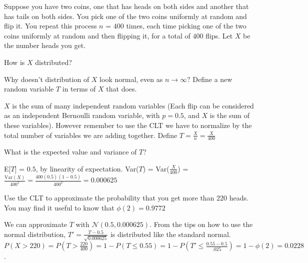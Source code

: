 Suppose you have two coins, one that has heads on both sides and another that has tails on both sides. You pick one of the two coins uniformly at random and flip it. You repeat this process $n$ = $400$ times, each time picking one of the two coins uniformly at random and then flipping it, for a total of $400$ flips. Let $X$ be the number heads you get.

\begin{question}
How is $X$ distributed?

\begin{solution}
\end{solution}
\end{question}

\begin{question}
Why doesn't distribution of $X$ look normal, even as $n \to \infty?$  Define a new random variable $T$ in terms of $X$ that does.

\begin{solution}
$X$ is the sum of many independent random variables (Each flip can be considered as an independent Bernoulli random variable, with $p = 0.5$, and $X$ is the sum of these variables). However remember to use the CLT we have to normalize by the total number of variables we are adding together. Define $T = \frac{X}{n} = \frac{X}{400}$
\end{solution}
\end{question}

\begin{question}
What is the expected value and variance of $T$?

\begin{solution}
E[$T$] = $0.5$, by linearity of expectation. Var($T$) = Var($\frac{X}{400}$)  = $\frac{\text{Var}(X)}{400^2} = \frac{400(0.5)(1-0.5)}{400^2} = 0.000625$
\end{solution}
\end{question}

\begin{question}
Use the CLT to approximate the probability that you get more than 220 heads. You may find it useful to know that $\phi(2) = 0.9772$

\begin{solution}
We can approximate $T$ with $\mathcal{N}(0.5, 0.000625)$. From the tips on how to use the normal distribution, $T' = \frac{T-0.5}{\sqrt{0.000625}}$ is distributed like the standard normal. 
$P(X>220) = P(T>\frac{220}{400}) = 1 - P(T \leq 0.55) = 1 - P(T' \leq \frac{0.55-0.5}{.025}) = 1 - \phi(2) = 0.0228$.
\end{solution}
\end{question}
